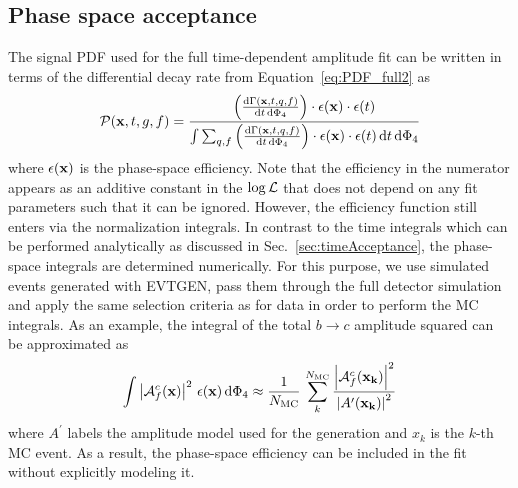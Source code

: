 \clearpage
\subsection{Phase space acceptance}
\label{sec:phasespaceAcceptance}

The signal PDF used for the full time-dependent amplitude fit can be written in terms of the differential decay rate from Equation~\ref{eq:PDF_full2} as
\begin{equation}
	\mathcal P(\mathbf{x},t,g,f) = 
	\frac{ \left( \frac{\text{d}\Gamma(\mathbf{x},t,q,f)}{\text{d}t \, \text{d}\Phi_4} \right) \cdot \epsilon(\mathbf{x}) \cdot \epsilon(t) }{\int \sum_{q,f} \left( \frac{\text{d}\Gamma(\mathbf{x},t,q,f)}{\text{d}t \, \text{d}\Phi_4} \right) \cdot \epsilon(\mathbf{x}) \cdot \epsilon(t) \, \text{d}t \, \text{d}\Phi_{4}  }  
\end{equation}
where $\epsilon(\mathbf{x})$ is the phase-space efficiency. 
Note that the efficiency in the numerator appears as an additive constant in the $\log {\cal L}$ that does not depend on any fit parameters such that it can be ignored.
However, the efficiency function still enters via the normalization integrals. 
In contrast to the time integrals which can be performed analytically as discussed in Sec.~\ref{sec:timeAcceptance},
the phase-space integrals are determined numerically.
For this purpose, we use simulated events generated with \textsf{EVTGEN}, pass them 
through the full detector simulation and apply the same selection criteria as for data 
in order to perform the MC integrals.
As an example, the integral of the total $b \to c$ amplitude squared can be approximated as 
\begin{equation}
	\label{eq:pdfPhspAcc}
	\int \left\vert   \mathcal A^c_{f}(\mathbf{x}) \right\vert^{2} \, \epsilon(\mathbf{x}) \, \text{d}\Phi_{4}   \approx 
	\frac{1}{N_{\rm MC}} \, \sum_{k}^{N_{\rm MC}}    \frac{\left\vert   \mathcal A^c_{f}(\bold{x_{k}}) \right\vert^{2}}
	{\left\vert A^{\prime}(\bold{x_{k}}) \right\vert^{2}}
\end{equation}
where $A^{\prime}$ labels the amplitude model used for the generation and
$x_{k}$ is the $k$-th MC event. As a result, the phase-space efficiency can be included in the  fit without explicitly modeling it.
\newline
\\

